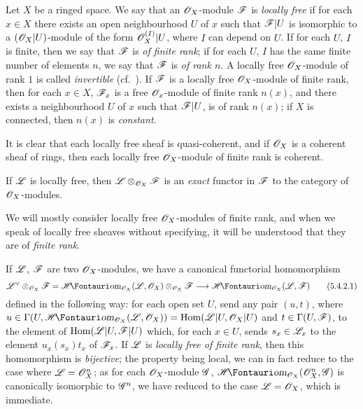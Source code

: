 \begin{env}[5.4.1]
\label{0.5.4.1}
Let $X$ be a ringed space.
We say that an $\mathscr{O}_X$-module $\mathscr{F}$ is \emph{locally free} if for each $x\in X$ there exists an open neighbourhood $U$ of $x$ such that $\mathscr{F}|U$ is isomorphic to a $(\mathscr{O}_X|U)$-module of the form $\mathscr{O}_X^{(I)}|U$, where $I$ can depend on $U$.
If for each $U$, $I$ is finite, then we say that $\mathscr{F}$ is \emph{of finite rank};
if for each $U$, $I$ has the same finite number of elements $n$, we say that $\mathscr{F}$ is \emph{of rank $n$}.
A locally free $\mathscr{O}_X$-module of rank $1$ is called \emph{invertible} (cf.~).
If $\mathscr{F}$ is a locally free $\mathscr{O}_X$-module of finite rank, then for each $x\in X$, $\mathscr{F}_x$ is a free $\mathscr{O}_x$-module of finite rank $n(x)$, and there exists a neighbourhood $U$ of $x$ such that $\mathscr{F}|U$, is of rank $n(x)$;
if $X$ is connected, then $n(x)$ is \emph{constant}.

It is clear that each locally free sheaf is quasi-coherent, and if $\mathscr{O}_X$ is a coherent sheaf of rings, then each locally free $\mathscr{O}_X$-module of finite rank is coherent.

If $\mathscr{L}$ is locally free, then $\mathscr{L}\otimes_{\mathscr{O}_X}\mathscr{F}$ is an \emph{exact} functor in $\mathscr{F}$ to the category of $\mathscr{O}_X$-modules.

We will mostly consider locally free $\mathscr{O}_X$-modules of finite rank,
and when we speak of locally free sheaves without specifying, it will be understood that they are of \emph{finite rank}.

\end{env}

\begin{env}[5.4.2]
\label{0.5.4.2}
If $\mathscr{L}$, $\mathscr{F}$ are two $\mathscr{O}_X$-modules, we have a canonical functorial homomorphism
\[
  \dual{\sh{L}}\otimes_{\sh{O}_X}\sh{F}=\shHom_{\sh{O}_X}(\sh{L},\sh{O}_X)\otimes_{\sh{O}_X}\sh{F}\to\shHom_{\sh{O}_X}(\sh{L},\sh{F})
  \tag{5.4.2.1}
\]
defined in the following way:
for each open set $U$, send any pair $(u,t)$, where $u\in\Gamma(U,\shHom_{\sh{O}_X}(\sh{L},\sh{O}_X))=\Hom(\sh{L}|U,\sh{O}_X|U)$ and $t\in\Gamma(U,\mathscr{F})$, to the element of $\operatorname{Hom}(\mathscr{L}|U,\mathscr{F}|U)$ which, for each $x\in U$, sends $s_x\in\mathscr{L}_x$ to the element $u_x(s_x)t_x$ of $\mathscr{F}_x$.
If $\mathscr{L}$ is \emph{locally free of finite rank}, then this homomorphism is \emph{bijective};
the property being local, we can in fact reduce to the case where $\mathscr{L}=\mathscr{O}_X^n$;
as for each $\mathscr{O}_X$-module $\mathscr{G}$, $\shHom_{\sh{O}_X}(\sh{O}_X^n,\sh{G})$ is canonically isomorphic to $\mathscr{G}^n$, we have reduced to the case $\mathscr{L}=\mathscr{O}_X$, which is immediate.
\end{env}

